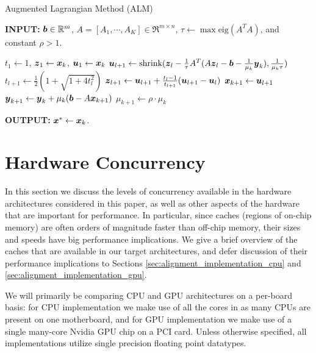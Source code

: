 \documentclass[10pt,twocolumn,letterpaper]{article}
\begin{document}
 \begin{algorithm}[h]
\caption{Augmented Lagrangian Method (ALM)}
{\bf INPUT:} ${\boldsymbol{b}} \in {\mathbb{R}}^m$, $A=[A_1,\cdots, A_K] \in \Re^{m \times n}$, $\tau\leftarrow \max\mbox{eig}(A^TA)$, and constant $\rho>1$.
\begin{algorithmic}[1]
\STATE $t_1 \leftarrow 1$, ${\boldsymbol{z}}_1 \leftarrow {\boldsymbol{x}}_k$, ${\boldsymbol{u}}_1 \leftarrow {\boldsymbol{x}}_k$ 
\STATE ${\boldsymbol{u}}_{l+1}  \leftarrow \mbox{shrink}({\boldsymbol{z}}_l - \frac{1}{\tau}A^T(A{\boldsymbol{z}}_l - {\boldsymbol{b}} - \frac{1}{\mu_k}{\boldsymbol{y}}_k), \frac{1}{\mu_k\tau})$
\STATE $t_{l+1} \leftarrow \frac{1}{2}( 1 + \sqrt{1+4t_l^2})$
\STATE ${\boldsymbol{z}}_{l+1} \leftarrow {\boldsymbol{u}}_{l+1}+ \frac{t_l - 1}{t_{l+1}}({\boldsymbol{u}}_{l+1} - {\boldsymbol{u}}_l)$ 
\ENDWHILE 
\STATE ${\boldsymbol{x}}_{k+1} \leftarrow {\boldsymbol{u}}_{l+1}$ 
\STATE ${\boldsymbol{y}}_{k+1} \leftarrow {\boldsymbol{y}}_k + \mu_k ({\boldsymbol{b}} - A{\boldsymbol{x}}_{k+1})$ 
\STATE $\mu_{k+1} \leftarrow \rho\cdot\mu_k$ 
\ENDWHILE 
\end{algorithmic}

{\bf OUTPUT:} ${\boldsymbol{x}}^* \leftarrow {\boldsymbol{x}}_k$.
\label{alg:alm}
\end{algorithm}

\section{Hardware Concurrency} \label{sec:concurrency}

In this section we discuss the levels of concurrency available in the hardware
architectures considered in this paper, as well as other aspects of the
hardware that are important for performance.  In particular, since caches
(regions of on-chip memory) are often orders of magnitude faster than off-chip
memory, their sizes and speeds have big performance implications.  We give a
brief overview of the caches that are available in our target architectures,
and defer discussion of their performance implications to Sections
\ref{sec:alignment_implementation_cpu} and
\ref{sec:alignment_implementation_gpu}.

We will primarily be comparing CPU and GPU architectures on a per-board basis:
for CPU implementation we make use of all the cores in as many CPUs are present
on one motherboard, and for GPU implementation we make use of a single
many-core Nvidia GPU chip on a PCI card. 
Unless otherwise specified, all implementations utilize single precision
floating point datatypes.  
\end{document}
